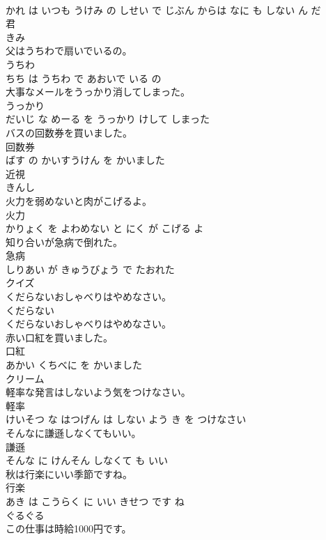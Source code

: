 \documentclass[8pt]{extreport}
\begin{document}
\begin{CJK}{UTF8}{min}
\\	かれ は いつも うけみ の しせい で じぶん からは なに も しない ん だ			
\\	君	
\\	きみ		
\\	父はうちわで扇いでいるの。	
\\	うちわ 
\\	ちち は うちわ で あおいで いる の			
\\	大事なメールをうっかり消してしまった。	
\\	うっかり 
\\	だいじ な めーる を うっかり けして しまった			
\\	バスの回数券を買いました。	
\\	回数券 
\\	ばす の かいすうけん を かいました			
\\	近視	
\\	きんし		
\\	火力を弱めないと肉がこげるよ。	
\\	火力 
\\	かりょく を よわめない と にく が こげる よ			
\\	知り合いが急病で倒れた。	
\\	急病 
\\	しりあい が きゅうびょう で たおれた			
\\	クイズ	
\\	くだらないおしゃべりはやめなさい。	
\\	くだらない 
\\	くだらないおしゃべりはやめなさい。			
\\	赤い口紅を買いました。	
\\	口紅 
\\	あかい くちべに を かいました			
\\	クリーム	
\\	軽率な発言はしないよう気をつけなさい。	
\\	軽率 
\\	けいそつ な はつげん は しない よう き を つけなさい			
\\	そんなに謙遜しなくてもいい。	
\\	謙遜 
\\	そんな に けんそん しなくて も いい			
\\	秋は行楽にいい季節ですね。	
\\	行楽 
\\	あき は こうらく に いい きせつ です ね			
\\	ぐるぐる	
\\	この仕事は時給1000円です。	

\end{CJK}
\end{document}
